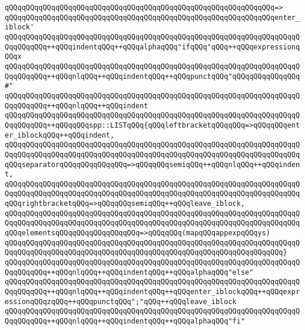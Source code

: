 \verb|qQQqqQQqqQQqqQQqqQQqqQQqqQQqqQQqqQQqqQQqqQQqqQQqqQQqqQQqqQQqqQQq=>|\newline
\verb|qQQqqQQqqQQqqQQqqQQqqQQqqQQqqQQqqQQqqQQqqQQqqQQqqQQqqQQqqQQqqQQqenter_iblock'|\newline
\verb|qQQqqQQqqQQqqQQqqQQqqQQqqQQqqQQqqQQqqQQqqQQqqQQqqQQqqQQqqQQqqQQqqQQqqQQqqQQqqQQq++qQQqindentqQQq++qQQqalphaqQQq"ifqQQq"qQQq++qQQqexpressionqQQqx|\newline
\verb|qQQqqQQqqQQqqQQqqQQqqQQqqQQqqQQqqQQqqQQqqQQqqQQqqQQqqQQqqQQqqQQqqQQqqQQqqQQqqQQq++qQQqnlqQQq++qQQqindentqQQq++qQQqpunctqQQq"qQQqqQQqqQQqqQQq#"|\newline
\verb|qQQqqQQqqQQqqQQqqQQqqQQqqQQqqQQqqQQqqQQqqQQqqQQqqQQqqQQqqQQqqQQqqQQqqQQqqQQqqQQq++qQQqnlqQQq++qQQqindent|\newline
\verb|qQQqqQQqqQQqqQQqqQQqqQQqqQQqqQQqqQQqqQQqqQQqqQQqqQQqqQQqqQQqqQQqqQQqqQQqqQQqqQQq++qQQqqQQqspp::LISTqQQq{qQQqleftbracketqQQqqQQq=>qQQqqQQqenter_iblockqQQq++qQQqindent,|\newline
\verb|qQQqqQQqqQQqqQQqqQQqqQQqqQQqqQQqqQQqqQQqqQQqqQQqqQQqqQQqqQQqqQQqqQQqqQQqqQQqqQQqqQQqqQQqqQQqqQQqqQQqqQQqqQQqqQQqqQQqqQQqqQQqqQQqqQQqqQQqqQQqqQQqseparatorqQQqqQQqqQQqqQQq=>qQQqqQQqsemiqQQq++qQQqnlqQQq++qQQqindent,|\newline
\verb|qQQqqQQqqQQqqQQqqQQqqQQqqQQqqQQqqQQqqQQqqQQqqQQqqQQqqQQqqQQqqQQqqQQqqQQqqQQqqQQqqQQqqQQqqQQqqQQqqQQqqQQqqQQqqQQqqQQqqQQqqQQqqQQqqQQqqQQqqQQqqQQqrightbracketqQQq=>qQQqqQQqsemiqQQq++qQQqleave_iblock,|\newline
\verb|qQQqqQQqqQQqqQQqqQQqqQQqqQQqqQQqqQQqqQQqqQQqqQQqqQQqqQQqqQQqqQQqqQQqqQQqqQQqqQQqqQQqqQQqqQQqqQQqqQQqqQQqqQQqqQQqqQQqqQQqqQQqqQQqqQQqqQQqqQQqqQQqelementsqQQqqQQqqQQqqQQqqQQq=>qQQqqQQq(mapqQQqappexpqQQqys)|\newline
\verb|qQQqqQQqqQQqqQQqqQQqqQQqqQQqqQQqqQQqqQQqqQQqqQQqqQQqqQQqqQQqqQQqqQQqqQQqqQQqqQQqqQQqqQQqqQQqqQQqqQQqqQQqqQQqqQQqqQQqqQQqqQQqqQQqqQQqqQQq}|\newline
\verb|qQQqqQQqqQQqqQQqqQQqqQQqqQQqqQQqqQQqqQQqqQQqqQQqqQQqqQQqqQQqqQQqqQQqqQQqqQQqqQQq++qQQqnlqQQq++qQQqindentqQQq++qQQqalphaqQQq"else"|\newline
\verb|qQQqqQQqqQQqqQQqqQQqqQQqqQQqqQQqqQQqqQQqqQQqqQQqqQQqqQQqqQQqqQQqqQQqqQQqqQQqqQQq++qQQqnlqQQq++qQQqindentqQQq++qQQqenter_iblockqQQq++qQQqexpressionqQQqzqQQq++qQQqpunctqQQq";"qQQq++qQQqleave_iblock|\newline
\verb|qQQqqQQqqQQqqQQqqQQqqQQqqQQqqQQqqQQqqQQqqQQqqQQqqQQqqQQqqQQqqQQqqQQqqQQqqQQqqQQq++qQQqnlqQQq++qQQqindentqQQq++qQQqalphaqQQq"fi"|\newline
